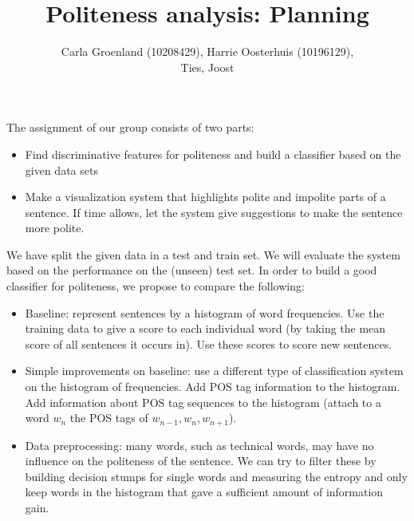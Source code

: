 \documentclass[11pt, english]{article}
\title{Politeness analysis: Planning}
\author{Carla Groenland (10208429), Harrie Oosterhuis (10196129), \\
Ties, Joost}
\begin{document}
\maketitle
The assignment of our group consists of two parts:
\begin{itemize}
\item Find discriminative features for politeness and build a classifier based on the given data sets
\item Make a visualization system that highlights polite and impolite parts of a sentence. If time allows, let the system give suggestions to make the sentence more polite.
\end{itemize}
We have split the given data in a test and train set. We will evaluate the system based on the performance on the (unseen) test set.
In order to build a good classifier for politeness, we propose to compare the following:
\begin{itemize}
\item Baseline: represent sentences by a histogram of word frequencies. Use the training data to give a score to each individual word (by taking the mean score of all sentences it occurs in). Use these scores to score new sentences. 
\item Simple improvements on baseline: use a different type of classification system on the histogram of frequencies. Add POS tag information to the histogram. Add information about POS tag sequences to the histogram (attach to a word $w_n$ the POS tags of $w_{n-1},w_n,w_{n+1}$).
\item Data preprocessing: many words, such as technical words, may have no influence on the politeness of the sentence. We can try to filter these by building decision stumps for single words and measuring the entropy and only keep words in the histogram that gave a sufficient amount of information gain.
\end{itemize}
\end{document}
